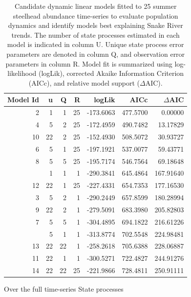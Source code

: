 \documentclass[10pt,a4paper]{article}
\begin{document}
\begin{table}

\caption{Candidate dynamic linear models fitted to 25 summer steelhead abundance time-series to evaluate population dynamics and identify models best explaining Snake River trends. The number of state processes estimated in each model is indicated in column U. Unique state process error parameters are denoted in column Q, and observation error parameters in column R. Model fit is summarized using log-likelihood (logLik), corrected Akaike Information Criterion (AICc), and relative model support ($\Delta$AIC).}
\centering
\begin{tabular}[t]{rrrrrrr}
\toprule
Model Id & u & Q & R & logLik & AICc & $\Delta$AIC\\
\midrule
2 & 1 & 1 & 25 & -173.6063 & 477.5700 & 0.00000\\
4 & 5 & 2 & 25 & -172.4959 & 490.7482 & 13.17829\\
10 & 22 & 2 & 25 & -152.4930 & 508.5072 & 30.93727\\
6 & 5 & 1 & 25 & -197.1921 & 537.0077 & 59.43771\\
8 & 5 & 5 & 25 & -195.7174 & 546.7564 & 69.18648\\
\addlinespace
1 & 1 & 1 & 1 & -290.3841 & 645.4864 & 167.91640\\
12 & 22 & 1 & 25 & -227.4331 & 654.7353 & 177.16530\\
3 & 5 & 2 & 1 & -290.2449 & 657.8599 & 180.28994\\
9 & 22 & 2 & 1 & -279.5091 & 683.3980 & 205.82803\\
7 & 5 & 5 & 1 & -304.4895 & 694.1822 & 216.61226\\
\addlinespace
5 & 5 & 1 & 1 & -313.8774 & 702.5548 & 224.98481\\
13 & 22 & 22 & 1 & -258.2618 & 705.6388 & 228.06887\\
11 & 22 & 1 & 1 & -300.5271 & 722.4827 & 244.91276\\
14 & 22 & 22 & 25 & -221.9866 & 728.4811 & 250.91111\\
\bottomrule
\end{tabular}
\end{table}

Over the full time-series State processes
\end{document}
